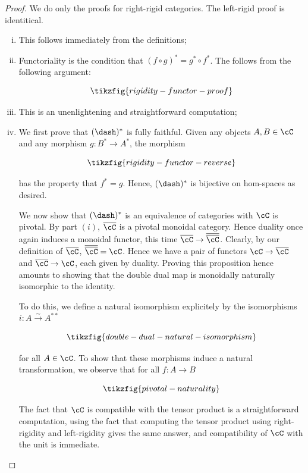 \begin{proof} We do only  the proofs for right-rigid categories. The left-rigid proof is identitical.

\begin{enumerate}[(i)]
\item This follows immediately from the definitions;

\item Functoriality is the condition that $(f\circ g)^{*}=g^{*}\circ f^{*}$. The follows from the following argument:

\begin{equation*}
\tikzfig{rigidity-functor-proof}
\end{equation*}

\item This is an unenlightening and straightforward computation;

\item  We first prove that $(\dash)^*$ is fully faithful. Given any objects $A,B\in \cC$ and any morphism $g:B^*\to A^*$, the morphism

\begin{equation*}
\tikzfig{rigidity-functor-reverse}
\end{equation*}

has the property that $f^*=g$. Hence, $(\dash)^*$ is bijective on hom-spaces as desired.

We now show that $(\dash)^*$ is an equivalence of categories with $\cC$ is pivotal.  By part $(i)$, $\overline{\cC}$ is a pivotal monoidal category. Hence duality once again induces a monoidal functor, this time $\overline{\cC}\to\overline{\overline{\cC}}$. Clearly, by our definition of $\overline{\cC}$, $\overline{\overline{\cC}}=\cC$. Hence we have a pair of functors $\cC\to \overline{\cC}$ and $\overline{\cC}\to\cC$, each given by duality. Proving this proposition hence amounts to showing that the double dual map is monoidally naturally isomorphic to the identity.

To do this, we define a natural isomorphism explicitely by the isomorphisms $i:A\xrightarrow{\sim}A^{**}$

\begin{equation*}
\tikzfig{double-dual-natural-isomorphism}
\end{equation*}

for all $A\in \cC$. To show that these morphisms induce a natural transformation, we observe that for all $f:A\to B$

\begin{equation*}
\tikzfig{pivotal-naturality}
\end{equation*}

The fact that $\cC$ is compatible with the tensor product is a straightforward computation, using the fact that computing the tensor product using right-rigidity and left-rigidity gives the same answer, and compatibility of $\cC$ with the unit is immediate.

\end{enumerate}
\end{proof}


